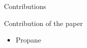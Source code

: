 \begin{frame}{Contributions}
    \begin{block}{Contribution of the paper}
        \begin{itemize}
            \item Propane
        \end{itemize}
    \end{block}
\end{frame}
